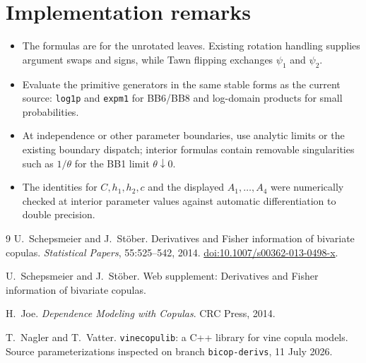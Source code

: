 \documentclass[10pt]{article}
\begin{document}
\section{Implementation remarks}

\begin{itemize}
\item The formulas are for the unrotated leaves.  Existing rotation handling
      supplies argument swaps and signs, while Tawn flipping exchanges
      $\psi_1$ and $\psi_2$.
\item Evaluate the primitive generators in the same stable forms as the current
      source: \texttt{log1p} and \texttt{expm1} for BB6/BB8 and log-domain
      products for small probabilities.
\item At independence or other parameter boundaries, use analytic limits or the
      existing boundary dispatch; interior formulas contain removable
      singularities such as $1/\theta$ for the BB1 limit $\theta\downarrow0$.
\item The identities for $C,h_1,h_2,c$ and the displayed $A_1,\ldots,A_4$
      were numerically checked at interior parameter values against automatic
      differentiation to double precision.
\end{itemize}

\begin{thebibliography}{9}
U.~Schepsmeier and J.~St\"ober.
\newblock Derivatives and Fisher information of bivariate copulas.
\newblock \emph{Statistical Papers}, 55:525--542, 2014.
\newblock \href{https://doi.org/10.1007/s00362-013-0498-x}{doi:10.1007/s00362-013-0498-x}.

U.~Schepsmeier and J.~St\"ober.
\newblock Web supplement: Derivatives and Fisher information of bivariate copulas.

H.~Joe.
\newblock \emph{Dependence Modeling with Copulas}.
\newblock CRC Press, 2014.

T.~Nagler and T.~Vatter.
\newblock \texttt{vinecopulib}: a C++ library for vine copula models.
\newblock Source parameterizations inspected on branch \texttt{bicop-derivs},
11 July 2026.
\end{thebibliography}
\end{document}
